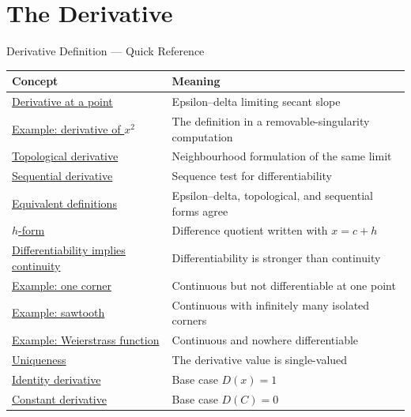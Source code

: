 \section{The Derivative}

\begin{toolkitbox}{Derivative Definition --- Quick Reference}
\small
\begin{tabular}{l l}
\toprule
\textbf{Concept} & \textbf{Meaning} \\
\midrule
\hyperref[def:derivative-at-a-point]{Derivative at a point} & Epsilon--delta limiting secant slope \\
\hyperref[ex:x2-derivative]{Example: derivative of \(x^2\)} & The definition in a removable-singularity computation \\
\hyperref[def:topological-definition-of-derivative-at-a-point]{Topological derivative} & Neighbourhood formulation of the same limit \\
\hyperref[def:sequential-definition-of-derivative-at-a-point]{Sequential derivative} & Sequence test for differentiability \\
\hyperref[thm:derivative-equivalence]{Equivalent definitions} & Epsilon--delta, topological, and sequential forms agree \\
\hyperref[prop:derivative-h-form-equivalence]{$h$-form} & Difference quotient written with \(x=c+h\) \\
\hyperref[thm:differentiable-implies-continuous]{Differentiability implies continuity} & Differentiability is stronger than continuity \\
\hyperref[ex:cont-not-diff-corner]{Example: one corner} & Continuous but not differentiable at one point \\
\hyperref[ex:cont-not-diff-sawtooth]{Example: sawtooth} & Continuous with infinitely many isolated corners \\
\hyperref[ex:weierstrass]{Example: Weierstrass function} & Continuous and nowhere differentiable \\
\hyperref[thm:uniqueness-of-the-derivative]{Uniqueness} & The derivative value is single-valued \\
\hyperref[prop:derivative-of-the-identity]{Identity derivative} & Base case \(D(x)=1\) \\
\hyperref[prop:derivative-of-a-constant]{Constant derivative} & Base case \(D(C)=0\) \\
\bottomrule
\end{tabular}
\end{toolkitbox}


